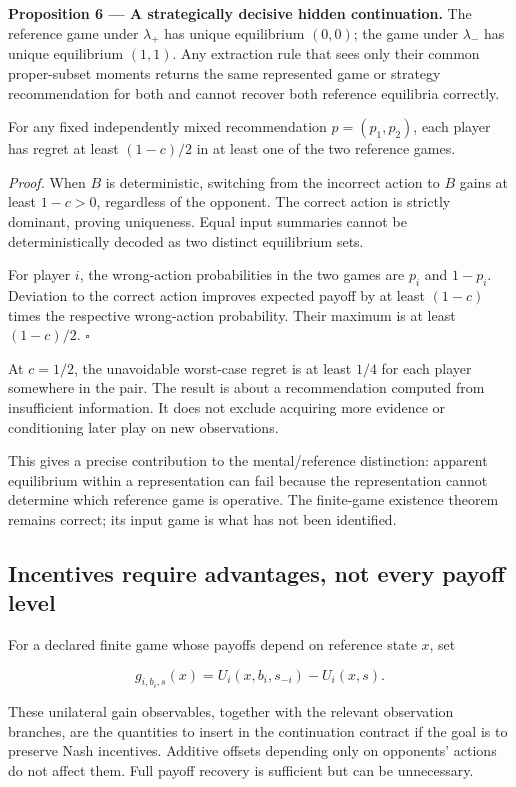 \documentclass[11pt,a4paper]{article}
\begin{document}
\textbf{Proposition 6 --- A strategically decisive hidden continuation.}
The reference game under \(\lambda_+\) has unique equilibrium \((0,0)\);
the game under \(\lambda_-\) has unique equilibrium \((1,1)\). Any
extraction rule that sees only their common proper-subset moments
returns the same represented game or strategy recommendation for both
and cannot recover both reference equilibria correctly.

For any fixed independently mixed recommendation \(p=(p_1,p_2)\), each
player has regret at least \((1-c)/2\) in at least one of the two
reference games.

\emph{Proof.} When \(B\) is deterministic, switching from the incorrect
action to \(B\) gains at least \(1-c>0\), regardless of the opponent.
The correct action is strictly dominant, proving uniqueness. Equal input
summaries cannot be deterministically decoded as two distinct
equilibrium sets.

For player \(i\), the wrong-action probabilities in the two games are
\(p_i\) and \(1-p_i\). Deviation to the correct action improves expected
payoff by at least \((1-c)\) times the respective wrong-action
probability. Their maximum is at least \((1-c)/2\). \(\square\)

At \(c=1/2\), the unavoidable worst-case regret is at least \(1/4\) for
each player somewhere in the pair. The result is about a recommendation
computed from insufficient information. It does not exclude acquiring
more evidence or conditioning later play on new observations.

This gives a precise contribution to the mental/reference distinction:
apparent equilibrium within a representation can fail because the
representation cannot determine which reference game is operative. The
finite-game existence theorem remains correct; its input game is what
has not been identified.

\subsection{Incentives require advantages, not every payoff
level}\label{incentives-require-advantages-not-every-payoff-level}

For a declared finite game whose payoffs depend on reference state
\(x\), set

\nopagebreak[4]

\[
g_{i,b_i,s}(x)=U_i(x,b_i,s_{-i})-U_i(x,s).
\]

These unilateral gain observables, together with the relevant
observation branches, are the quantities to insert in the continuation
contract if the goal is to preserve Nash incentives. Additive offsets
depending only on opponents' actions do not affect them. Full payoff
recovery is sufficient but can be unnecessary.
\end{document}
